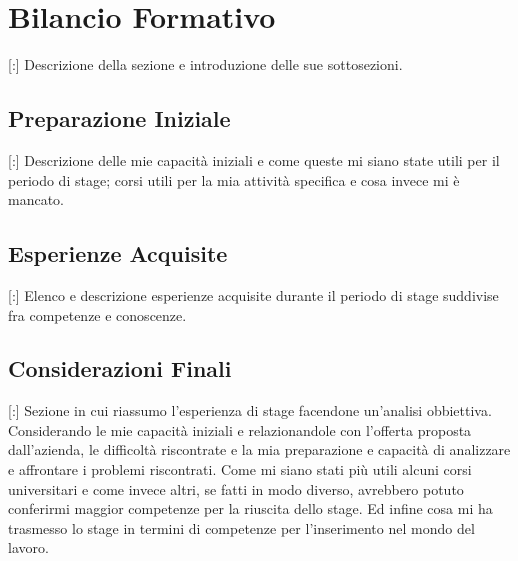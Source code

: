 \documentclass[11pt]{book}              %
\begin{document}
\section{Bilancio Formativo}

[:] Descrizione della sezione e introduzione delle sue sottosezioni.

\subsection{Preparazione Iniziale}

[:] Descrizione delle mie capacità iniziali e come queste mi siano state utili per il periodo di stage; corsi utili per la mia attività specifica e cosa invece mi è mancato.

\subsection{Esperienze Acquisite}

[:] Elenco e descrizione esperienze acquisite durante il periodo di stage suddivise fra competenze e conoscenze.

\subsection{Considerazioni Finali}

[:] Sezione in cui riassumo l'esperienza di stage facendone un'analisi obbiettiva. Considerando le mie capacità iniziali e relazionandole con l'offerta proposta dall'azienda, le difficoltà riscontrate e la mia preparazione e capacità di analizzare e affrontare i problemi riscontrati. Come mi siano stati più utili alcuni corsi universitari e come invece altri, se fatti in modo diverso, avrebbero potuto conferirmi maggior competenze per la riuscita dello stage. Ed infine cosa mi ha trasmesso lo stage in termini di competenze per l'inserimento nel mondo del lavoro.

\newpage
\end{document}
